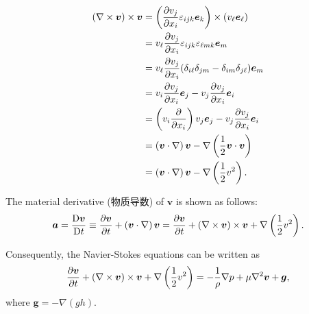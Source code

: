\begin{align*}
    \left(\nabla \times \boldsymbol v \right) \times \boldsymbol v
    & = \left({\partial v_j \over \partial x_i} \varepsilon_{ijk} \boldsymbol e_k \right) \times \left(v_\ell \boldsymbol e_\ell \right) \\
    & = v_\ell {\partial v_j \over \partial x_i} \varepsilon_{ijk} \varepsilon_{\ell mk} \boldsymbol e_m \\
    & = v_\ell {\partial v_j \over \partial x_i} (\delta_{i \ell}\delta_{jm} - \delta_{im}\delta_{j \ell}) \boldsymbol e_m \\
    & = v_i {\partial v_j \over \partial x_i} \boldsymbol e_j - v_j {\partial v_j \over \partial x_i} \boldsymbol e_i \\
    & = \left(v_i {\partial \over \partial x_i}\right) v_j \boldsymbol e_j - v_j {\partial v_j \over \partial x_i} \boldsymbol e_i \\
    & = \left(\boldsymbol v \cdot \nabla \right) \boldsymbol v - \nabla \left( {1 \over 2} \boldsymbol v \cdot \boldsymbol v \right) \\
    & = \left(\boldsymbol v \cdot \nabla \right) \boldsymbol v - \nabla \left( {1 \over 2} v^2 \right). \\
\end{align*}

The material derivative (物质导数) of \(\boldsymbol v\) is shown as
follows:
\[\boldsymbol a = {\mathrm D \boldsymbol v \over \mathrm Dt} \equiv {\partial \boldsymbol v \over \partial t} + \left(\boldsymbol v \cdot \nabla \right) \boldsymbol v = {\partial \boldsymbol v \over \partial t} + \left(\nabla \times \boldsymbol v \right) \times \boldsymbol v + \nabla \left( {1 \over 2} v^2 \right).\]

Consequently, the Navier-Stokes equations can be written as
\[ {\partial \boldsymbol v \over \partial t} + \left(\nabla \times \boldsymbol v \right) \times \boldsymbol v + \nabla \left( {1 \over 2} v^2 \right) = -{1 \over \rho} \nabla p + \mu \nabla^2 \boldsymbol v + \boldsymbol g,\]
where \(\boldsymbol g = - \nabla (gh).\)
